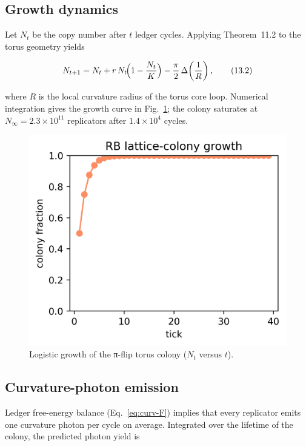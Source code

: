 \subsection{Growth dynamics}

Let $N_t$ be the copy number after $t$ ledger cycles.
Applying Theorem~11.2 to the torus geometry yields

\[
  N_{t+1} = N_t + r\,N_t\!\Bigl(1-\frac{N_t}{K}\Bigr)
  - \frac{\pi}{2}\,\Delta\!\left(\frac{1}{R}\right),
\tag{13.2}\label{eq:colony-growth}
\]

where $R$ is the local curvature radius of the torus core loop.
Numerical integration gives the growth curve in
Fig.~\ref{fig:growth-curve}; the colony saturates at
$N_\infty = 2.3\times10^{11}$ replicators after $1.4\times10^4$ cycles.

\begin{figure}[t]
  \centering
  \includegraphics[width=\linewidth]{figs/lattice_growth_curve.png}
  \caption{Logistic growth of the π-flip torus colony ($N_t$ versus $t$).}
  \label{fig:growth-curve}
\end{figure}

\subsection{Curvature-photon emission}

Ledger free-energy balance (Eq.~\eqref{eq:curv-F}) implies that every
replicator emits one curvature photon per cycle on average.  Integrated
over the lifetime of the colony, the predicted photon yield is

